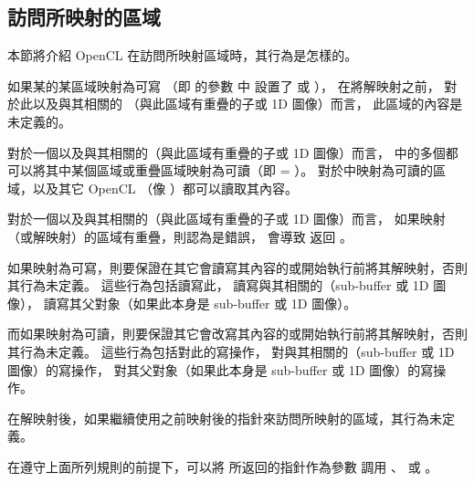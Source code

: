 \subsection{訪問所映射的區域}

本節將介紹 OpenCL  在訪問所映射區域時，其行為是怎樣的。

如果某的某區域映射為可寫
（即  的參數  中
設置了  或  ），
在將解映射之前，
對於此以及與其相關的
（與此區域有重疊的子或 1D 圖像）而言，
此區域的內容是未定義的。

對於一個以及與其相關的（與此區域有重疊的子或 1D 圖像）而言，
中的多個都可以將其中某個區域或重疊區域映射為可讀（即  = ）。
對於中映射為可讀的區域，以及其它 OpenCL （像  ）都可以讀取其內容。

對於一個以及與其相關的（與此區域有重疊的子或 1D 圖像）而言，
如果映射（或解映射）的區域有重疊，則認為是錯誤，
會導致  返回 。

如果映射為可寫，則要保證在其它會讀寫其內容的或開始執行前將其解映射，否則其行為未定義。
這些行為包括讀寫此，
讀寫與其相關的（sub-buffer 或 1D 圖像），
讀寫其父對象（如果此本身是 sub-buffer 或 1D 圖像）。

而如果映射為可讀，則要保證其它會改寫其內容的或開始執行前將其解映射，否則其行為未定義。
這些行為包括對此的寫操作，
對與其相關的（sub-buffer 或 1D 圖像）的寫操作，
對其父對象（如果此本身是 sub-buffer 或 1D 圖像）的寫操作。

在解映射後，如果繼續使用之前映射後的指針來訪問所映射的區域，其行為未定義。

在遵守上面所列規則的前提下，可以將  所返回的指針作為參數  調用
 、
 或 。

